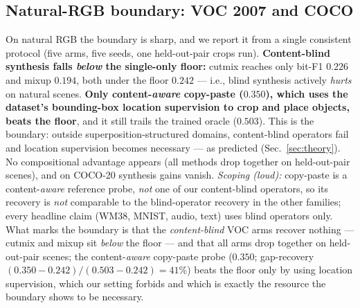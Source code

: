 \documentclass[11pt]{article}
\begin{document}
\subsection{Natural-RGB boundary: VOC 2007 and COCO}
On natural RGB the boundary is sharp, and we report it from a single consistent
protocol (five arms, five seeds, one held-out-pair crops run). \textbf{Content-blind
synthesis falls \emph{below} the single-only floor:} cutmix reaches only bit-F1
$0.226$ and mixup $0.194$, both under the floor $0.242$ --- i.e., blind synthesis
actively \emph{hurts} on natural scenes. \textbf{Only content-\emph{aware}
copy-paste ($0.350$), which uses the dataset's bounding-box location supervision to
crop and place objects, beats the floor}, and it still trails the trained oracle
($0.503$). This is the boundary: outside superposition-structured domains,
content-blind operators fail and location supervision becomes necessary --- as
predicted (Sec.~\ref{sec:theory}). No compositional advantage appears (all methods
drop together on held-out-pair scenes), and on COCO-20 synthesis gains vanish.
\emph{Scoping (loud):} copy-paste is a content-\emph{aware} reference probe,
\emph{not} one of our content-blind operators, so its recovery is \emph{not}
comparable to the blind-operator recovery in the other families; every headline
claim (WM38, MNIST, audio, text) uses blind operators only. What marks the boundary
is that the \emph{content-blind} VOC arms recover nothing --- cutmix and mixup sit
\emph{below} the floor --- and that all arms drop together on held-out-pair scenes;
the content-\emph{aware} copy-paste probe ($0.350$; gap-recovery
$(0.350-0.242)/(0.503-0.242) = 41\%$) beats the floor only by using location
supervision, which our setting forbids and which is exactly the resource the boundary
shows to be necessary.
\end{document}
